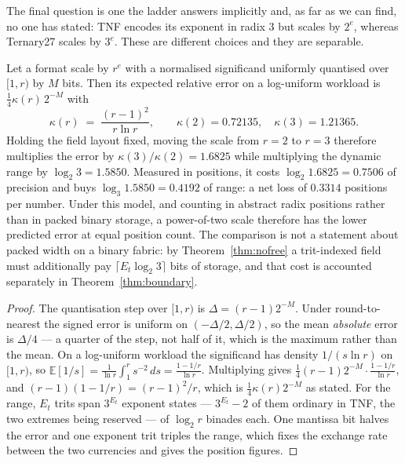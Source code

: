 The final question is one the ladder answers implicitly and, as far as we can
find, no one has stated: TNF encodes its exponent in radix 3 but scales by
$2^{e}$, whereas Ternary27 scales by $3^{e}$. These are different choices and
they are separable.

\begin{theorem}[Scale radix: under the log-uniform model at fixed field layout,
$r=2$ has lower relative error than $r=3$]
\label{thm:scaleradix}
Let a format scale by $r^{e}$ with a normalised significand uniformly quantised
over $[1, r)$ by $M$ bits. Then its expected relative error on a log-uniform
workload is $\tfrac14\kappa(r)\,2^{-M}$ with
\[
\kappa(r) \;=\; \frac{(r-1)^{2}}{r\ln r},
\qquad \kappa(2) = 0.72135,\quad \kappa(3) = 1.21365 .
\]
Holding the field layout fixed, moving the scale from $r=2$ to $r=3$ therefore
multiplies the error by $\kappa(3)/\kappa(2) = 1.6825$ while multiplying the
dynamic range by $\log_2 3 = 1.5850$. Measured in positions, it costs
$\log_2 1.6825 = 0.7506$ of precision and buys $\log_3 1.5850 = 0.4192$ of range:
a net loss of $0.3314$ positions per number. Under this model, and counting in
abstract radix positions rather than in packed binary storage, a power-of-two
scale therefore has the lower predicted error at equal position count. The
comparison is not a statement about packed width on a binary fabric: by
Theorem~\ref{thm:nofree} a trit-indexed field must additionally pay
$\lceil E_t\log_2 3\rceil$ bits of storage, and that cost is accounted separately
in Theorem~\ref{thm:boundary}.
\end{theorem}

\begin{proof}
The quantisation step over $[1,r)$ is $\Delta = (r-1)2^{-M}$. Under
round-to-nearest the signed error is uniform on $(-\Delta/2, \Delta/2)$, so the
mean \emph{absolute} error is $\Delta/4$ --- a quarter of the step, not half of
it, which is the maximum rather than the mean. On a log-uniform workload the
significand has density $1/(s\ln r)$ on $[1,r)$, so
$\mathbb{E}[1/s] = \frac{1}{\ln r}\int_1^{r} s^{-2}\,ds = \frac{1-1/r}{\ln r}$.
Multiplying gives $\tfrac14 (r-1)2^{-M}\cdot\frac{1-1/r}{\ln r}$, and
$(r-1)(1-1/r) = (r-1)^2/r$, which is $\tfrac14\kappa(r)2^{-M}$ as stated. For
the range, $E_t$ trits span $3^{E_t}$ exponent states --- $3^{E_t}-2$ of them
ordinary in TNF, the two extremes being reserved --- of $\log_2 r$ binades each. One
mantissa bit halves the error and one exponent trit triples the range, which
fixes the exchange rate between the two currencies and gives the position
figures.
\end{proof}

